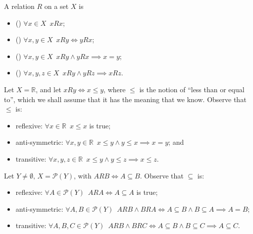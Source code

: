 \documentclass[notoc,notitlepage]{tufte-book}
\begin{document}
\begin{defn}[Relations]\label{defn:relations}
  A relation $R$ on a set $X$ is 
  \begin{itemize}
    \item () $\forall x \in X \enspace xRx$;
    \item () $\forall x, y \in X \enspace xRy \iff yRx$;
    \item () $\forall x, y \in X \enspace xRy \land yRx \implies x = y$;
    \item () $\forall x, y , z \in X \enspace xRy \land yRz \implies xRz$.
  \end{itemize}
\end{defn}

\begin{eg}
  Let $X = \mathbb{R}$, and let $xRy \iff x \leq y$, where $\leq$ is the notion of ``less than or equal to'', which we shall assume that it has the meaning that we know. Observe that $\leq$ is:
  \begin{itemize}
    \item reflexive: $\forall x \in \mathbb{R} \enspace x \leq x$ is true;
    \item anti-symmetric: $\forall x, y \in \mathbb{R} \enspace x \leq y \land y \leq x \implies x = y$; and
    \item transitive: $\forall x, y , z \in \mathbb{R} \enspace x \leq y \land y \leq z \implies x \leq z$.
  \end{itemize}
\end{eg}

\begin{eg}
  Let $Y \neq \emptyset, \, X = \mathcal{P}(Y)$, with $ARB \iff A \subseteq B$. Observe that $\subseteq$ is:
  \begin{itemize}
    \item reflexive: $\forall A \in \mathcal{P}(Y) \enspace ARA \iff A \subseteq A$ is true;
    \item anti-symmetric: $\forall A, B \in \mathcal{P}(Y) \enspace ARB \land BRA \iff A \subseteq B \land B \subseteq A \implies A = B$;
    \item transitive: $\forall A, B, C \in \mathcal{P}(Y) \enspace ARB \land BRC \iff A \subseteq B \land B \subseteq C \implies A \subseteq C$.
  \end{itemize}
\end{eg}
\end{document}

